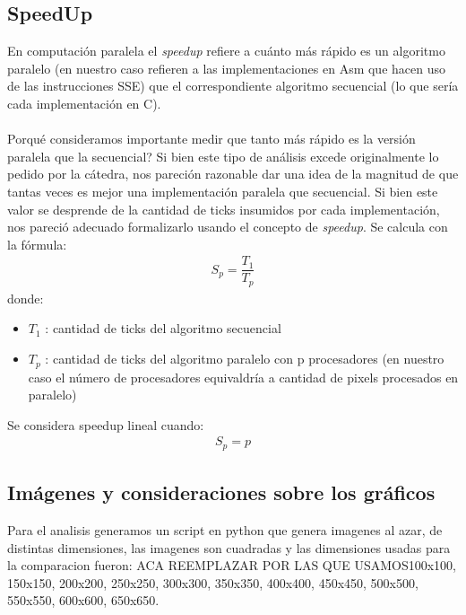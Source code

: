 \subsection{SpeedUp}
\indent En computaci\'on paralela el \textit{speedup} refiere a cu\'anto m\'as r\'apido es un algoritmo paralelo (en nuestro caso refieren a las implementaciones en Asm que hacen uso de las instrucciones SSE) que el correspondiente algoritmo secuencial (lo que ser\'ia cada implementaci\'on en C).\\\\
Porqu\'e consideramos importante medir que tanto m\'as r\'apido es la versi\'on paralela que la secuencial? Si bien este tipo de an\'alisis excede originalmente lo pedido por la c\'atedra, nos pareci\'on razonable dar una idea de la magnitud de que tantas veces es mejor una implementaci\'on paralela que secuencial. Si bien este valor se desprende de la cantidad de ticks insumidos por cada implementaci\'on, nos pareci\'o adecuado formalizarlo usando el concepto de \textit{speedup}. Se calcula con la f\'ormula:\\
\begin{align}
S_{p} = \dfrac{T_{1}} {T_{p}}
\end{align}
donde:\\
\begin{itemize}
	\item $T_{1}$ : cantidad de ticks del algoritmo secuencial
	\item $T_{p}$ : cantidad de ticks del algoritmo paralelo con p procesadores (en nuestro caso el n\'umero de procesadores equivaldr\'ia a cantidad de pixels procesados en paralelo)
\end{itemize}
Se considera speedup lineal cuando: \\
\begin{align}
S_{p} = p
\end{align}


\subsection{Im\'agenes y consideraciones sobre los gr\'aficos}
Para el analisis generamos un script en python que genera imagenes al azar, de distintas dimensiones, las imagenes son cuadradas y las dimensiones usadas para la comparacion fueron:
	ACA REEMPLAZAR POR LAS QUE USAMOS100x100, 150x150, 200x200, 250x250, 300x300, 350x350, 400x400, 450x450, 500x500, 550x550, 600x600, 650x650.\\

